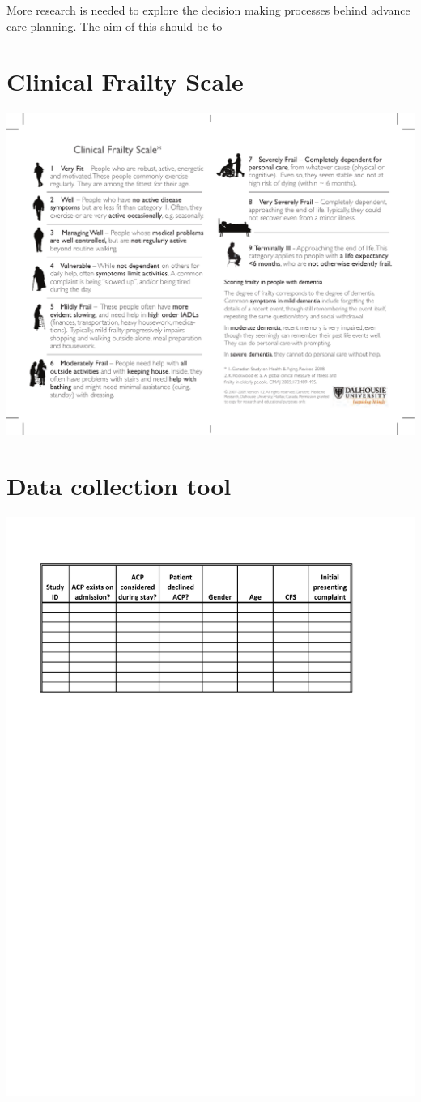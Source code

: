 \documentclass
[
	12pt,
	a4paper,
	oneside,
]{report}
\begin{document}
More research is needed to explore the decision making processes behind
advance care planning. The aim of this should be to 

\printbibliography[heading=bibintoc]

\clearpage

\appendix
\chapter{Clinical Frailty Scale}
\label{apx:cfs}
\includegraphics[width=\textwidth]{CFS}

\chapter{Data collection tool}
\label{apx:tool}
\includegraphics[width=\textwidth]{dataCollection}


\end{document}
